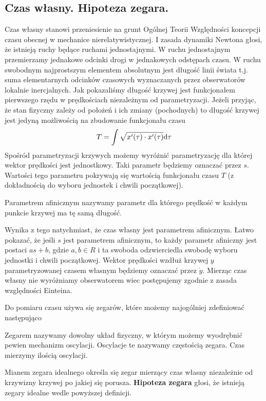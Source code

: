 \subsection{Czas własny. Hipoteza zegara.}
Czas własny stanowi przeniesienie na grunt Ogólnej Teorii Względności 
koncepcji czasu obecnej w mechanice nierelatywistycznej.
I zasada dynamiki Newtona głosi, że istnieją ruchy będące ruchami
jednostajnymi.  W ruchu jednostajnym przemierzamy 
jednakowe odcinki drogi w jednakowych odstępach czasu. 
W ruchu swobodnym najprostszym elementem absolutnym jest 
długość linii świata t.j. suma elementarnych 
odcinków czasowych wyznaczanych przez obserwatorów
lokalnie inercjalnych. Jak pokazaliśmy długość krzywej jest
funkcjonałem pierwszego rzędu w prędkościach niezależnym 
od parametryzacji. Jeżeli przyjąc, że stan fizyczny zależy 
od położeń i ich zmiany (pochodnych) to długość krzywej jest 
jedyną możliwością na zbudowanie funkcjonału czasu
\begin{align*}
T = \int \sqrt{x'(\tau) \cdot x'(\tau)} \text{d} \tau
\end{align*}
Spośród parametryzacji krzywych 
 możemy wyróżnić parametryzację 
dla której wektor prędkości jest 
jednostkowy. Taki parametr będziemy oznaczać przez $s$. 
Wartości tego parametru pokrywają się wartością funkcjonału czasu $T$
(z dokładnością do wyboru jednostek i chwili początkowej). 
\begin{definition}
Parametrem afinicznym nazywamy parametr dla którego 
prędkość w każdym punkcie krzywej ma tę samą długość.
\end{definition}
Wynika z tego natychmiast, że czas własny jest parametrem afinicznym.
Łatwo pokazać, że jeśli $s$ jest 
parametrem afinicznym, to każdy parametr afiniczny 
jest postaci $a s+b$, gdzie $a,b\in R$ i ta swoboda odzwierciedla
swobodę wyboru jednostki i chwili początkowej.
Wektor prędkości wzdłuż krzywej $y$ parametryzowanej czasem 
własnym będziemy oznaczać przez $\dot{y}$.
Mierząc czas własny nie wyróżniamy obserwatorem wiec 
postępujemy zgodnie z zasada względności Einteina. 

Do pomiaru czasu używa się zegarów, które możemy 
najogólniej zdefiniować następująco
\begin{definition}
Zegarem nazywamy dowolny układ fizyczny, w którym możemy wyodrębnić pewien
mechanizm oscylacji. Oscylacje te nazywamy częstością zegara. Czas mierzymy
ilością oscylacji.
\end{definition}
Mianem zegara idealnego określa się zegar mierzący czas własny
niezależnie od krzywizny krzywej po jakiej się porusza.
\textbf{Hipoteza zegara} głosi, że istnieją zegary idealne wedle 
powyższej definicji.



